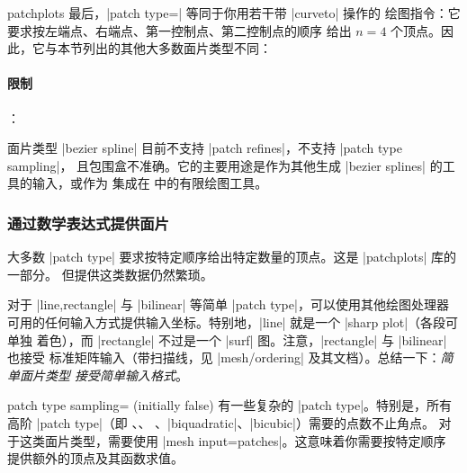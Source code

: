 {\begin{pgfplotslibrary}{patchplots}
最后，|patch type=| 等同于你用若干带 |curveto|
操作的 \Tikz{} 绘图指令：它要求按左端点、右端点、第一控制点、第二控制点的顺序
给出 $n=4$ 个顶点。因此，它与本节列出的其他大多数面片类型不同：

\begin{codeexample}[]
\end{codeexample}


\paragraph{限制}：

面片类型 |bezier spline| 目前不支持 |patch refines|，不支持 |patch type sampling|，
且包围盒不准确。它的主要用途是作为其他生成 |bezier splines| 的工具的输入，或作为
集成在 \PGFPlots{} 中的有限绘图工具。


\subsubsection{通过数学表达式提供面片}

大多数 |patch type| 要求按特定顺序给出特定数量的顶点。这是 |patchplots| 库的一部分。
但提供这类数据仍然繁琐。

对于 |line,rectangle| 与 |bilinear| 等简单 |patch type|，可以使用其他绘图处理器
可用的任何输入方式提供输入坐标。特别地，|line| 就是一个 |sharp plot|（各段可单独
着色），而 |rectangle| 不过是一个 |surf| 图。注意，|rectangle| 与 |bilinear| 也接受
标准矩阵输入（带扫描线，见 |mesh/ordering| 及其文档）。总结一下：\emph{简单面片类型
接受简单输入格式}。


\begin{pgfplotskey}{patch type sampling= (initially false)}
    有一些复杂的 |patch type|。特别是，所有高阶 |patch type|（即
    、、
    、|biquadratic|、|bicubic|）需要的点数不止角点。
    对于这类面片类型，需要使用 |mesh input=patches|。这意味着你需要按特定顺序
    提供额外的顶点及其函数求值。


\end{pgfplotskey}
\end{pgfplotslibrary}}

